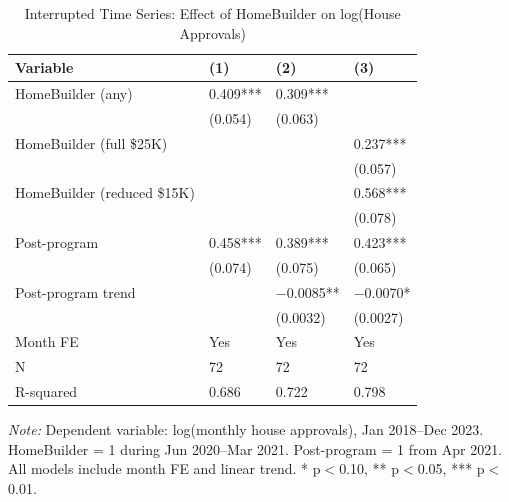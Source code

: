 \begin{table}[!h]
\centering
\caption{\label{tab:its}Interrupted Time Series: Effect of HomeBuilder on log(House Approvals)}
\footnotesize
\begin{tabular}[t]{llll}
\toprule
Variable & (1) & (2) & (3)\\
\midrule
HomeBuilder (any) & 0.409*** & 0.309*** & \\
 & (0.054) & (0.063) & \\
HomeBuilder (full \$25K) &  &  & 0.237***\\
 &  &  & (0.057)\\
HomeBuilder (reduced \$15K) &  &  & 0.568***\\
 &  &  & (0.078)\\
Post-program & 0.458*** & 0.389*** & 0.423***\\
 & (0.074) & (0.075) & (0.065)\\
Post-program trend &  & $-$0.0085** & $-$0.0070*\\
 &  & (0.0032) & (0.0027)\\
\addlinespace
Month FE & Yes & Yes & Yes\\
N & 72 & 72 & 72\\
R-squared & 0.686 & 0.722 & 0.798\\
\bottomrule
\end{tabular}

\vspace{0.3em}
{\scriptsize \textit{Note:} Dependent variable: log(monthly house approvals), Jan 2018--Dec 2023. HomeBuilder = 1 during Jun 2020--Mar 2021. Post-program = 1 from Apr 2021. All models include month FE and linear trend. * p$<$0.10, ** p$<$0.05, *** p$<$0.01.}
\end{table}

